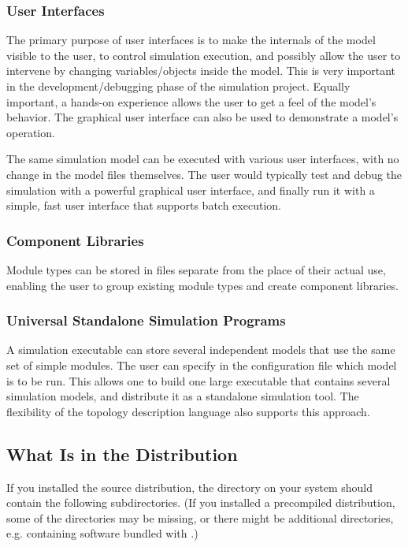 \subsubsection{User Interfaces}

The primary purpose of user interfaces is to make the internals
of the model visible to the user, to control simulation execution,
and possibly allow the user to intervene by changing variables/objects
inside the model. This is very important in the development/debugging
phase of the simulation project. Equally important, a hands-on
experience allows the user to get a feel of the model's
behavior. The graphical user interface can also be used to
demonstrate a model's operation.


The same simulation model can be executed with various user
interfaces, with no change in the model files themselves.
The user would typically test and debug the simulation with a powerful
graphical user interface, and finally run it with a simple,
fast user interface that supports batch execution.


\subsubsection{Component Libraries}

Module types can be stored in files separate from the place
of their actual use, enabling the user to group existing
module types and create component libraries.


\subsubsection{Universal Standalone Simulation Programs}


A simulation executable can store several independent models
that use the same set of simple modules. The user can specify
in the configuration file which model is to be run. This
allows one to build one large executable that contains several
simulation models, and distribute it as a standalone simulation
tool. The flexibility of the topology description language also
supports this approach.


\subsection{What Is in the Distribution}

If you installed the source distribution, the {\opp} directory on your system
should contain the following subdirectories. (If you installed a precompiled
distribution, some of the directories may be missing, or there might be
additional directories, e.g. containing software bundled with {\opp}.)

